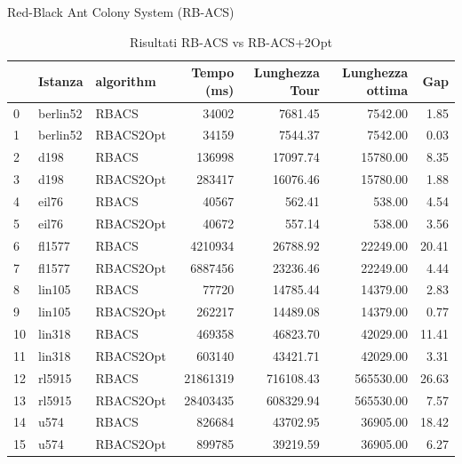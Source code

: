 \documentclass{beamer}
\begin{document}
\begin{frame}{Red-Black Ant Colony System (RB-ACS)}
    \begin{table}[H]
        \centering
        \caption{Risultati RB-ACS vs RB-ACS+2Opt}
        \begin{tabular}{lllrrrr}
            \toprule
               & Istanza  & algorithm & Tempo (ms) & Lunghezza Tour & Lunghezza ottima & Gap   \\
            \midrule
            0  & berlin52 & RBACS     & 34002      & 7681.45        & 7542.00          & 1.85  \\
            1  & berlin52 & RBACS2Opt & 34159      & 7544.37        & 7542.00          & 0.03  \\
            2  & d198     & RBACS     & 136998     & 17097.74       & 15780.00         & 8.35  \\
            3  & d198     & RBACS2Opt & 283417     & 16076.46       & 15780.00         & 1.88  \\
            4  & eil76    & RBACS     & 40567      & 562.41         & 538.00           & 4.54  \\
            5  & eil76    & RBACS2Opt & 40672      & 557.14         & 538.00           & 3.56  \\
            6  & fl1577   & RBACS     & 4210934    & 26788.92       & 22249.00         & 20.41 \\
            7  & fl1577   & RBACS2Opt & 6887456    & 23236.46       & 22249.00         & 4.44  \\
            8  & lin105   & RBACS     & 77720      & 14785.44       & 14379.00         & 2.83  \\
            9  & lin105   & RBACS2Opt & 262217     & 14489.08       & 14379.00         & 0.77  \\
            10 & lin318   & RBACS     & 469358     & 46823.70       & 42029.00         & 11.41 \\
            11 & lin318   & RBACS2Opt & 603140     & 43421.71       & 42029.00         & 3.31  \\
            12 & rl5915   & RBACS     & 21861319   & 716108.43      & 565530.00        & 26.63 \\
            13 & rl5915   & RBACS2Opt & 28403435   & 608329.94      & 565530.00        & 7.57  \\
            14 & u574     & RBACS     & 826684     & 43702.95       & 36905.00         & 18.42 \\
            15 & u574     & RBACS2Opt & 899785     & 39219.59       & 36905.00         & 6.27  \\
            \bottomrule
        \end{tabular}
    \end{table}
\end{frame}
\end{document}

